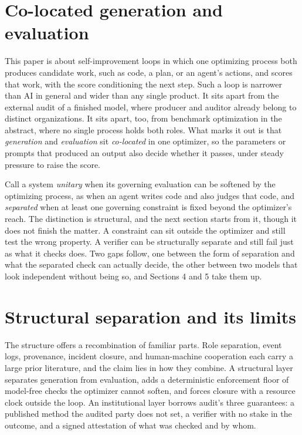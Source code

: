 \documentclass[11pt]{article}
\begin{document}
\section{Co-located generation and evaluation}

This paper is about self-improvement loops in which one optimizing process both produces candidate work, such as code, a plan, or an agent's actions, and scores that work, with the score conditioning the next step. Such a loop is narrower than AI in general and wider than any single product. It sits apart from the external audit of a finished model, where producer and auditor already belong to distinct organizations. It sits apart, too, from benchmark optimization in the abstract, where no single process holds both roles. What marks it out is that \emph{generation} and \emph{evaluation} sit \emph{co-located} in one optimizer, so the parameters or prompts that produced an output also decide whether it passes, under steady pressure to raise the score.

Call a system \emph{unitary} when its governing evaluation can be softened by the optimizing process, as when an agent writes code and also judges that code, and \emph{separated} when at least one governing constraint is fixed beyond the optimizer's reach. The distinction is structural, and the next section starts from it, though it does not finish the matter. A constraint can sit outside the optimizer and still test the wrong property. A verifier can be structurally separate and still fail just as what it checks does. Two gaps follow, one between the form of separation and what the separated check can actually decide, the other between two models that look independent without being so, and Sections 4 and 5 take them up.

\section{Structural separation and its limits}

The structure offers a recombination of familiar parts. Role separation, event logs, provenance, incident closure, and human-machine cooperation each carry a large prior literature, and the claim lies in how they combine. A structural layer separates generation from evaluation, adds a deterministic enforcement floor of model-free checks the optimizer cannot soften, and forces closure with a resource clock outside the loop. An institutional layer borrows audit's three guarantees: a published method the audited party does not set, a verifier with no stake in the outcome, and a signed attestation of what was checked and by whom.
\end{document}
